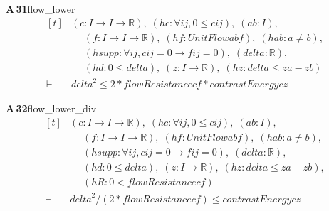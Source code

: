 \documentclass[conference]{IEEEtran}
\theoremstyle{definition}
\newcommand{\lean}[1]{\textsf{\footnotesize #1}}
\begin{document}
\noindent\textbf{A\,31}\quad\lean{flow\_lower}
{\footnotesize\[ \begin{aligned}[t]
&(\mathit{c} : \mathit{I} \to \mathit{I} \to \mathbb{R} ),\; (\mathit{hc} : \forall \mathit{i} \mathit{j}, 0 \leq \mathit{c} \mathit{i} \mathit{j}),\; (\mathit{a} \mathit{b} : \mathit{I}),\\
&\quad \; (\mathit{f} : \mathit{I} \to \mathit{I} \to \mathbb{R} ),\; (\mathit{hf} : \mathit{UnitFlow} \mathit{a} \mathit{b} \mathit{f}),\; (\mathit{hab} : \mathit{a} \neq \mathit{b}),\\
&\quad \; (\mathit{hsupp} : \forall \mathit{i} \mathit{j}, \mathit{c} \mathit{i} \mathit{j} = 0 \to \mathit{f} \mathit{i} \mathit{j} = 0),\; (\mathit{delta} : \mathbb{R} ),\\
&\quad \; (\mathit{hd} : 0 \leq \mathit{delta}),\; (\mathit{z} : \mathit{I} \to \mathbb{R} ),\; (\mathit{hz} : \mathit{delta} \leq \mathit{z} \mathit{a}-\mathit{z} \mathit{b})\\
\vdash\;&\mathit{delta}^{2} \leq 2*\mathit{flowResistance} \mathit{c} \mathit{f}*\mathit{contrastEnergy} \mathit{c} \mathit{z}
\end{aligned} \]}

\noindent\textbf{A\,32}\quad\lean{flow\_lower\_div}
{\footnotesize\[ \begin{aligned}[t]
&(\mathit{c} : \mathit{I} \to \mathit{I} \to \mathbb{R} ),\; (\mathit{hc} : \forall \mathit{i} \mathit{j}, 0 \leq \mathit{c} \mathit{i} \mathit{j}),\; (\mathit{a} \mathit{b} : \mathit{I}),\\
&\quad \; (\mathit{f} : \mathit{I} \to \mathit{I} \to \mathbb{R} ),\; (\mathit{hf} : \mathit{UnitFlow} \mathit{a} \mathit{b} \mathit{f}),\; (\mathit{hab} : \mathit{a} \neq \mathit{b}),\\
&\quad \; (\mathit{hsupp} : \forall \mathit{i} \mathit{j}, \mathit{c} \mathit{i} \mathit{j} = 0 \to \mathit{f} \mathit{i} \mathit{j} = 0),\; (\mathit{delta} : \mathbb{R} ),\\
&\quad \; (\mathit{hd} : 0 \leq \mathit{delta}),\; (\mathit{z} : \mathit{I} \to \mathbb{R} ),\; (\mathit{hz} : \mathit{delta} \leq \mathit{z} \mathit{a}-\mathit{z} \mathit{b}),\\
&\quad \; (\mathit{hR} : 0 < \mathit{flowResistance} \mathit{c} \mathit{f})\\
\vdash\;&\mathit{delta}^{2}/(2*\mathit{flowResistance} \mathit{c} \mathit{f}) \leq \mathit{contrastEnergy} \mathit{c} \mathit{z}
\end{aligned} \]}
\end{document}
